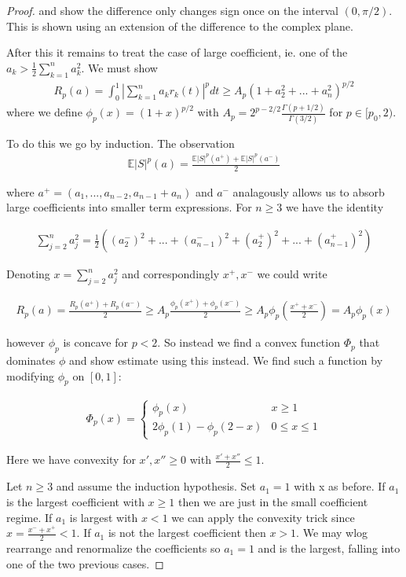 \documentclass[10pt]{article}
\newcommand{\E}{\mathbb{E}}
\newcommand{\1}{\textbf{1}}
\theoremstyle{remark}
\theoremstyle{definition}
\begin{document}
\begin{proof}
	and show the difference only changes sign once on the interval $(0,\pi/2)$. This is shown using an extension of the difference to the complex plane.

	After this it remains to treat the case of large coefficient, ie. one of the $a_k > \frac{1}{2}\sum_{k=1}^na_k^2$. We must show
	\begin{align*}
		R_p(a) = \int_0^1|\sum_{k=1}^n a_kr_k(t)|^p dt \geq A_p(1+a_2^2+...+a_n^2)^{p/2}
	\end{align*}
	where we define $\phi_p(x) = (1+x)^ {p/2}$ with $A_p = 2^{p-2/2}\frac{\Gamma(p+1/2)}{\Gamma(3/2)}$ for $p \in [p_0,2)$. 

	To do this we go by induction. The observation
	\begin{align*}
		\E|S|^p(a) = \frac{\E|S|^p(a^+) + \E|S|^p(a^-)}{2}
	\end{align*}

	where $a^+ = (a_1,...,a_{n-2},a_{n-1}+a_n)$ and $a^-$ analagously allows us to absorb large coefficients into smaller term expressions. For $n \geq 3$ we have the identity

	\begin{align*}
		\sum_{j=2}^n a_j^2 = \frac{1}{2}((a_2^-)^2 + ... +(a_{n-1}^-)^2 + (a_2^+)^2 + ... + (a_{n-1}^+)^2)
	\end{align*}

	Denoting $x = \sum_{j=2}^n a_j^2$ and correspondingly $x^+,x^-$ we could write

	\begin{align*}
		R_p(a) = \frac{R_p(a^+)+R_p(a^-)}{2} \geq A_p \frac{\phi_p(x^+)+\phi_p(x^-)}{2} \geq A_p \phi_p(\frac{x^++x^-}{2}) = A_p \phi_p(x)
	\end{align*}

	however $\phi_p$ is concave for $p < 2$. So instead we find a convex function $\Phi_p$ that dominates $\phi$ and show estimate using this instead. We find such a function by modifying $\phi_p$ on $[0,1]$:

	\begin{align*}
		\Phi_p(x) = 
		\begin{cases}
			\phi_p(x) & x \geq 1\\
			2 \phi_p(1) - \phi_p(2-x) & 0 \leq x \leq 1
		\end{cases}
	\end{align*}

	Here we have convexity for $x',x'' \geq 0$ with $\frac{x'+x''}{2} \leq 1$. 

	Let $n \geq 3$ and assume the induction hypothesis. Set $a_1 = 1$ with x as before. If $a_1$ is the largest coefficient with $x \geq 1$ then we are just in the small coefficient regime. If $a_1$ is largest with $x < 1$ we can apply the convexity trick since $x = \frac{x^-+x^+}{2} < 1$. If $a_1$ is not the largest coefficient then $x > 1$. We may wlog rearrange and renormalize the coefficients so $a_1 =1$ and is the largest, falling into one of the two previous cases. 


\end{proof}
\end{document}
